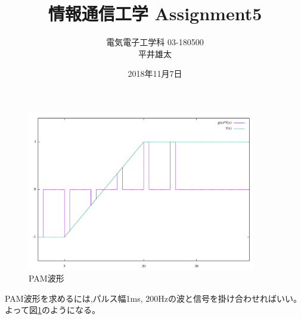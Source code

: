 \documentclass[dvipdfmx]{jsarticle}
\begin{document}
    \title{情報通信工学 Assignment5}
    \author{電気電子工学科 03-180500 \\ 平井雄太}
    \date{2018年11月7日}
    \maketitle
    \section{}
    \subsection{}
    \begin{figure}[H]
        \centering
        \includegraphics[width=10cm]{graph1.png}
        \caption{PAM波形}
        \label{fig:1}
    \end{figure}
    PAM波形を求めるには,パルス幅1ms, 200Hzの波と信号を掛け合わせればいい。
    よって図\ref{fig:1}のようになる。
\end{document}
